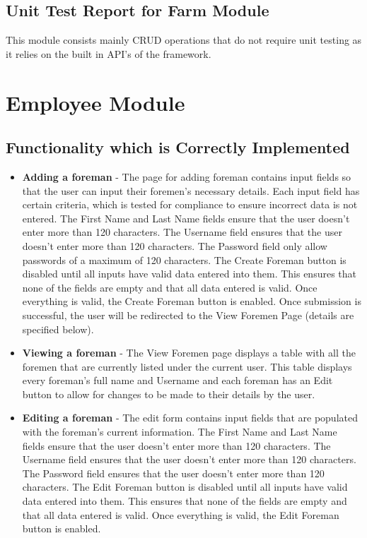 \documentclass[11pt,fleqn]{book} %
\begin{document}
		\subsection{Unit Test Report for Farm Module}
			This module consists mainly CRUD operations that do not require unit testing as it relies on the built in API's of the framework.
	\section{Employee Module}
		\subsection{Functionality which is Correctly Implemented}
			\begin{itemize}
				\item\textbf{Adding a foreman} -
				The page for adding foreman contains input fields so that the user can input their foremen's necessary details. Each input field has certain criteria, which is tested for compliance to ensure incorrect data is not entered. The First Name and Last Name fields ensure that the user doesn't enter more than 120 characters. The Username field ensures that the user doesn't enter more than 120 characters. The Password field only allow passwords of a maximum of 120 characters. The Create Foreman button is disabled until all inputs have valid data entered into them. This ensures that none of the fields are empty and that all data entered is valid. Once everything is valid, the Create Foreman button is enabled. Once submission is successful, the user will be redirected to the View Foremen Page (details are specified below).
				
				\item\textbf{Viewing a foreman} -
				The View Foremen page displays a table with all the foremen that are currently listed under the current user. This table displays every foreman's full name and Username and each foreman has an Edit button to allow for changes to be made to their details by the user.
				
				\item\textbf{Editing a foreman} -
				The edit form contains input fields that are populated with the foreman's current information. The First Name and Last Name fields ensure that the user doesn't enter more than 120 characters. The Username field ensures that the user doesn't enter more than 120 characters. The Password field ensures that the user doesn't enter more than 120 characters. The Edit Foreman button is disabled until all inputs have valid data entered into them. This ensures that none of the fields are empty and that all data entered is valid. Once everything is valid, the Edit Foreman button is enabled.
				
			\end{itemize}
\end{document}

